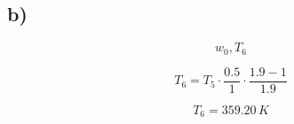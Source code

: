 

\subsection*{b)}

\[
w_0, T_6
\]

\[
T_6 = T_5 \cdot \frac{0.5}{1} \cdot \frac{1.9 - 1}{1.9}
\]

\[
T_6 = 359.20 \, K
\]